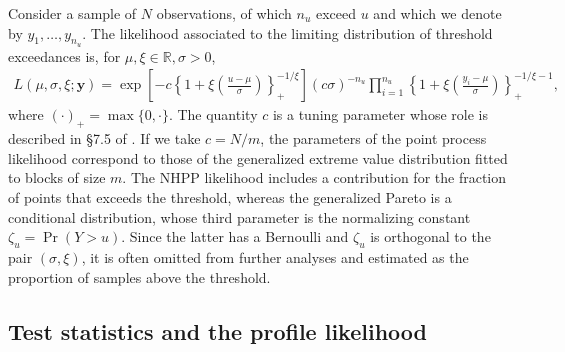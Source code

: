 \documentclass[]{book}
\begin{document}
Consider a sample of \(N\) observations, of which \(n_u\) exceed \(u\) and which we denote by \(y_1, \ldots, y_{n_u}\). The likelihood associated to the limiting distribution of threshold exceedances is, for \(\mu, \xi \in \mathbb{R}, \sigma >0\),
\begin{align}
L(\mu, \sigma, \xi; \boldsymbol{y}) = \exp \left[ - c \left\{1+ \xi \left( \frac{u-\mu}{\sigma}\right)\right\}^{-1/\xi}_{+}\right] (c\sigma)^{-n_u}\prod_{i=1}^{n_u} \left\{1+\xi\left( \frac{y_i-\mu}{\sigma}\right)\right\}^{-1/\xi-1}_{+},\label{eq:ppp_lik}
\end{align}
where \((\cdot)_{+} = \max\{0, \cdot\}\). The quantity \(c\) is a tuning parameter whose role is described in \S 7.5 of \citet{Coles:2001}. If we take \(c=N/m\), the parameters of the point process likelihood correspond to those of the generalized extreme value distribution fitted to blocks of size \(m\). The NHPP likelihood includes a contribution for the fraction of points that exceeds the threshold, whereas the generalized Pareto is a conditional distribution, whose third parameter is the normalizing constant \(\zeta_u=\Pr(Y>u)\). Since the latter has a Bernoulli and \(\zeta_u\) is orthogonal to the pair \((\sigma, \xi)\), it is often omitted from further analyses and estimated as the proportion of samples above the threshold.

\hypertarget{test-statistics-and-the-profile-likelihood}{%
\subsection{Test statistics and the profile likelihood}\label{test-statistics-and-the-profile-likelihood}}
\end{document}
